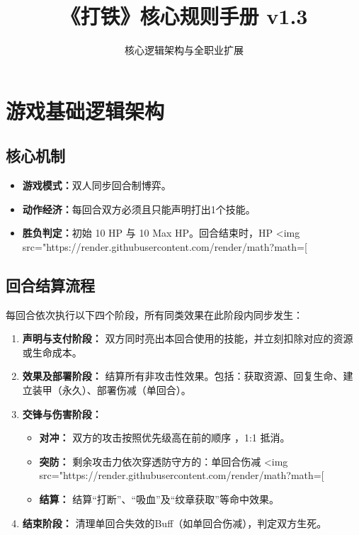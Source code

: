 \documentclass[a4paper,10pt]{ctexart}
\title{《打铁》核心规则手册 v1.3}
\author{核心逻辑架构与全职业扩展}
\date{}
\begin{document}
\maketitle

\section{游戏基础逻辑架构}

\subsection{核心机制}
\begin{itemize}
    \item \textbf{游戏模式：}双人同步回合制博弈。
    \item \textbf{动作经济：}每回合双方必须且只能声明打出1个技能。
    \item \textbf{胜负判定：}初始 10 HP 与 10 Max HP。回合结束时，HP <img src="https://render.githubusercontent.com/render/math?math=\bbox[%
\end{itemize}

\subsection{回合结算流程}
每回合依次执行以下四个阶段，所有同类效果在此阶段内同步发生：

\begin{enumerate}
    \item \textbf{声明与支付阶段：}
    双方同时亮出本回合使用的技能，并立刻扣除对应的资源或生命成本。
    \item \textbf{效果及部署阶段：}
    结算所有非攻击性效果。包括：获取资源、回复生命、建立装甲（永久）、部署伤减（单回合）。
    \item \textbf{交锋与伤害阶段：}
    \begin{itemize}
        \item \textbf{对冲：} 双方的攻击按照优先级高在前的顺序 ，1:1 抵消。
        \item \textbf{突防：} 剩余攻击力依次穿透防守方的：单回合伤减 <img src="https://render.githubusercontent.com/render/math?math=\bbox[%
        \item \textbf{结算：} 结算“打断”、“吸血”及“纹章获取”等命中效果。
    \end{itemize}
    \item \textbf{结束阶段：}
    清理单回合失效的Buff（如单回合伤减），判定双方生死。
\end{enumerate}
\end{document}
